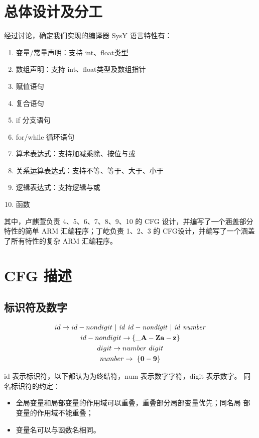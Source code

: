 \documentclass[UTF8,a4paper,10pt]{ctexart}
\begin{document}
\section{总体设计及分工}
经过讨论，确定我们实现的编译器 SysY 语言特性有：
\begin{enumerate}
  \item 变量/常量声明：支持 int、float类型
  \item 数组声明：支持 int、float类型及数组指针
  \item 赋值语句
  \item 复合语句
  \item if 分支语句
  \item for/while 循环语句
  \item 算术表达式：支持加减乘除、按位与或
  \item 关系运算表达式：支持不等、等于、大于、小于
  \item 逻辑表达式：支持逻辑与或
  \item 函数
\end{enumerate}

其中，卢麒萱负责 4、5、6、7、8、9、10 的 CFG 设计，并编写了一个涵盖部分特性的简单 ARM 汇编程序；丁屹负责 1、2、3 的 CFG设计，并编写了一个涵盖了所有特性的复杂 ARM 汇编程序。

\section{CFG 描述}
\subsection{标识符及数字}
\begin{gather*}
  id \rightarrow id-nondigit\ |\ \it{id}\ id-nondigit\  |\ \it{id}\ number\\
  id-nondigit \rightarrow \rm\bf{\{\_A-Za-z\}}\\
  digit \rightarrow number\ digit\\
  number \rightarrow\ \rm\bf{\{0-9\}}\\
\end{gather*}

id 表示标识符，以下都认为为终结符，num 表示数字字符，digit 表示数字。
同名标识符的约定：
\begin{itemize}
  \item 全局变量和局部变量的作用域可以重叠，重叠部分局部变量优先；同名局
        部变量的作用域不能重叠；
  \item 变量名可以与函数名相同。
\end{itemize}
\end{document}
